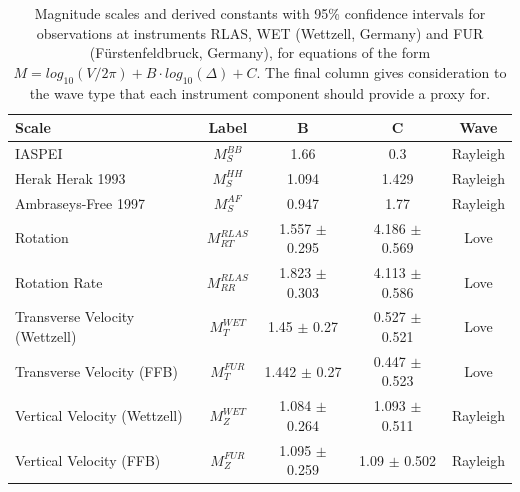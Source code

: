 \documentclass{gji}
\begin{document}
\begin{table}
\begin{minipage}{115mm}
	\begin{center}
		\begin{tabular}{ |l|c|c|c|c| } 
		        \bf{Scale} & \bf{Label} & \bf{B} & \bf{C}  & \bf{Wave}\\ \hline
        IASPEI & $M_{S}^{BB}$ & 1.66 & 0.3  & Rayleigh \\ \hline
        Herak Herak 1993 & $M_{S}^{HH}$ & 1.094 & 1.429  & Rayleigh \\ \hline
        Ambraseys-Free 1997 & $M_{S}^{AF}$ & 0.947 & 1.77  & Rayleigh \\ \hline
        Rotation  & $M^{RLAS}_{RT}$ & 1.557 $\pm$ 0.295 & 4.186 $\pm$ 0.569  & Love \\ \hline
        Rotation Rate & $M^{RLAS}_{RR}$ & 1.823 $\pm$ 0.303 & 4.113 $\pm$ 0.586  & Love\\ \hline 
        Transverse Velocity (Wettzell) & $M^{WET}_T$ & 1.45 $\pm$ 0.27 & 0.527 $\pm$ 0.521 & Love \\ \hline
        Transverse Velocity (FFB) & $M^{FUR}_T$ & 1.442 $\pm$ 0.27 & 0.447 $\pm$ 0.523 & Love \\ \hline
        Vertical Velocity (Wettzell) & $M^{WET}_Z$ & 1.084 $\pm$ 0.264 & 1.093 $\pm$ 0.511  & Rayleigh \\ \hline
        Vertical Velocity (FFB) & $M^{FUR}_Z$ & 1.095 $\pm$ 0.259 & 1.09 $\pm$ 0.502  & Rayleigh \\ \hline
		\end{tabular}
		
    		\caption{Magnitude scales and derived constants with 95\% confidence intervals for observations at instruments RLAS, WET (Wettzell, Germany) and FUR (F\"urstenfeldbruck, Germany), for equations of the form $M = log_{10}(V/2\pi) + B\cdot log_{10}(\Delta) + C$. The final column gives consideration to the wave type that each instrument component should provide a proxy for.}
		\label{tab:scales}
	\end{center}
	\end{minipage}
\end{table}
\end{document}
